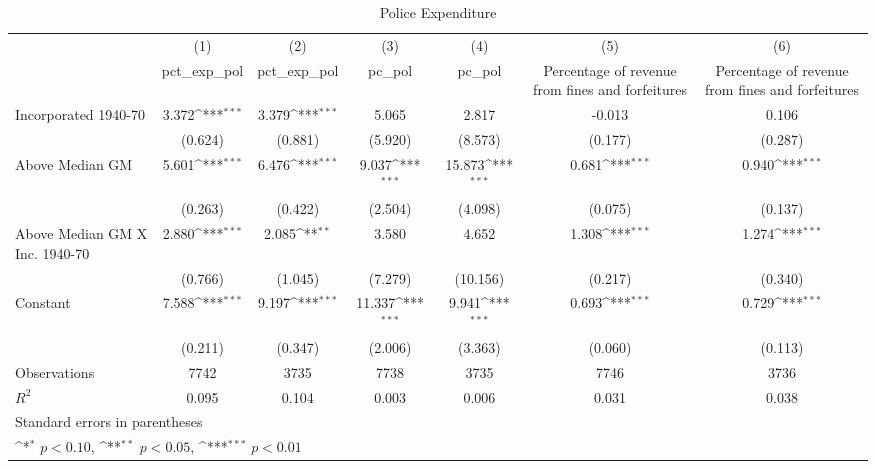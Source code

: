 \begin{table}[htbp]\centering
\def\sym#1{\ifmmode^{#1}\else\(^{#1}\)\fi}
\caption{Police Expenditure}
\begin{tabular}{l*{6}{c}}
\hline\hline
                    &\multicolumn{1}{c}{(1)}&\multicolumn{1}{c}{(2)}&\multicolumn{1}{c}{(3)}&\multicolumn{1}{c}{(4)}&\multicolumn{1}{c}{(5)}&\multicolumn{1}{c}{(6)}\\
                    &\multicolumn{1}{c}{pct\_exp\_pol}&\multicolumn{1}{c}{pct\_exp\_pol}&\multicolumn{1}{c}{pc\_pol}&\multicolumn{1}{c}{pc\_pol}&\multicolumn{1}{c}{Percentage of revenue from fines and forfeitures}&\multicolumn{1}{c}{Percentage of revenue from fines and forfeitures}\\
\hline
Incorporated 1940-70&       3.372\sym{***}&       3.379\sym{***}&       5.065         &       2.817         &      -0.013         &       0.106         \\
                    &     (0.624)         &     (0.881)         &     (5.920)         &     (8.573)         &     (0.177)         &     (0.287)         \\
[1em]
Above Median GM     &       5.601\sym{***}&       6.476\sym{***}&       9.037\sym{***}&      15.873\sym{***}&       0.681\sym{***}&       0.940\sym{***}\\
                    &     (0.263)         &     (0.422)         &     (2.504)         &     (4.098)         &     (0.075)         &     (0.137)         \\
[1em]
Above Median GM X Inc. 1940-70&       2.880\sym{***}&       2.085\sym{**} &       3.580         &       4.652         &       1.308\sym{***}&       1.274\sym{***}\\
                    &     (0.766)         &     (1.045)         &     (7.279)         &    (10.156)         &     (0.217)         &     (0.340)         \\
[1em]
Constant            &       7.588\sym{***}&       9.197\sym{***}&      11.337\sym{***}&       9.941\sym{***}&       0.693\sym{***}&       0.729\sym{***}\\
                    &     (0.211)         &     (0.347)         &     (2.006)         &     (3.363)         &     (0.060)         &     (0.113)         \\
\hline
Observations        &        7742         &        3735         &        7738         &        3735         &        7746         &        3736         \\
\(R^{2}\)           &       0.095         &       0.104         &       0.003         &       0.006         &       0.031         &       0.038         \\
\hline\hline
\multicolumn{7}{l}{\footnotesize Standard errors in parentheses}\\
\multicolumn{7}{l}{\footnotesize \sym{*} \(p<0.10\), \sym{**} \(p<0.05\), \sym{***} \(p<0.01\)}\\
\end{tabular}
\end{table}
